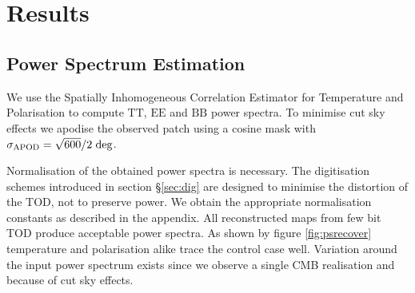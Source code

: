 \documentclass[apj]{emulateapj}
\begin{document}



\section{Results}
\label{sec:results}

\subsection{Power Spectrum Estimation}
\label{subsec:psestimation}

We use the Spatially Inhomogeneous Correlation Estimator for Temperature and Polarisation \citep[PolSpice;][]{polspice} to compute $\mathrm{TT}$, $\mathrm{EE}$ and $\mathrm{BB}$ power spectra. To minimise cut sky effects we apodise the observed patch using a cosine mask with $\sigma_{\mathrm{APOD}} = \sqrt{600}/2 \hspace{0.7ex} \mathrm{deg}$. %


Normalisation of the obtained power spectra is necessary. The digitisation schemes introduced in section \S\ref{sec:dig} are designed to minimise the distortion of the TOD, not to preserve power. We obtain the appropriate normalisation constants as described in the appendix. All reconstructed maps from few bit TOD produce acceptable power spectra. As shown by figure \ref{fig:psrecover} temperature and polarisation alike trace the control case well. Variation around the input power spectrum exists since we observe a single CMB realisation and because of cut sky effects.
\end{document}
